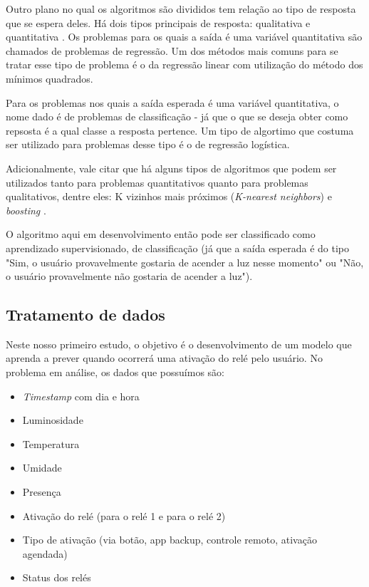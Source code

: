 				Outro plano no qual os algoritmos são divididos tem relação ao tipo de resposta que se espera deles. Há dois tipos principais de resposta: qualitativa e quantitativa  \cite{islr}. Os problemas para os quais a saída é uma variável quantitativa são chamados de problemas de regressão. Um dos métodos mais comuns para se tratar esse tipo de problema é o da regressão linear com utilização do método dos mínimos quadrados.

				Para os problemas nos quais a saída esperada é uma variável quantitativa, o nome dado é de problemas de classificação - já que o que se deseja obter como repsosta é a qual classe a resposta pertence. Um tipo de algortimo que costuma ser utilizado para problemas desse tipo é o de regressão logística.

				Adicionalmente, vale citar que há alguns tipos de algoritmos que podem ser utilizados tanto para problemas quantitativos quanto para problemas qualitativos, dentre eles: K vizinhos mais próximos (\emph{K-nearest neighbors}) e \emph{boosting} \cite{islr}.

				O algoritmo aqui em desenvolvimento então pode ser classificado como aprendizado supervisionado, de classificação (já que a saída esperada é do tipo "Sim, o usuário provavelmente gostaria de acender a luz nesse momento" ou "Não, o usuário provavelmente não gostaria de acender a luz").

		\subsection{Tratamento de dados}

			Neste nosso primeiro estudo, o objetivo é o desenvolvimento de um modelo que aprenda a prever quando ocorrerá uma ativação do relé pelo usuário. No problema em análise, os dados que possuímos são:

			\begin{itemize}
				\item \emph{Timestamp} com dia e hora
				\item Luminosidade
				\item Temperatura
				\item Umidade
				\item Presença
				\item Ativação do relé (para o relé 1 e para o relé 2)
				\item Tipo de ativação (via botão, app backup, controle remoto, ativação agendada)
				\item Status dos relés
			\end{itemize}

